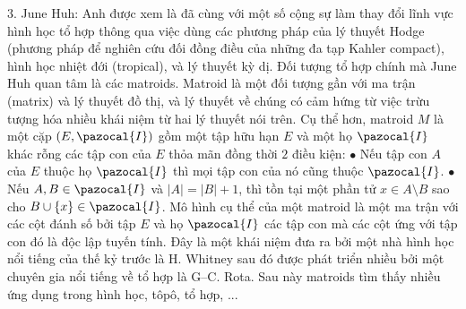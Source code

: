\begin{multicols}{2}
	$3.$ June Huh: Anh được xem là đã cùng với một số cộng sự làm thay đổi lĩnh vực hình học tổ hợp thông qua việc dùng các phương pháp của lý thuyết Hodge (phương pháp để nghiên cứu đối đồng điều của những đa tạp Kahler compact), hình học nhiệt đới (tropical), và lý thuyết kỳ dị. Đối tượng tổ hợp chính mà June Huh quan tâm là các matroids. Matroid là một đối tượng gần với ma trận (matrix) và lý thuyết đồ thị, và lý thuyết về chúng có cảm hứng từ việc trừu tượng hóa nhiều khái niệm từ hai lý thuyết nói trên. Cụ thể hơn, matroid $M$ là một cặp $(E,\pazocal{I})$ gồm một tập hữu hạn $E$ và một họ $\pazocal{I}$ khác rỗng các tập con của $E$ thỏa mãn đồng thời $2$ điều kiện:
	\vskip 0.1cm
	$\bullet$ Nếu tập con $A$ của $E$ thuộc họ $\pazocal{I}$ thì mọi tập con của nó cũng thuộc $\pazocal{I}$.
	\vskip 0.1cm
	$\bullet$ Nếu $A, B \in \pazocal{I}$ và $|A| = |B| +1$, thì tồn tại một phần tử $x \in A \setminus B$ sao cho $B \cup \{x\} \in \pazocal{I}$.
	\vskip 0.1cm
	Mô hình cụ thể của một matroid là một ma trận với các cột đánh số bởi tập $E$ và họ $\pazocal{I}$ các tập con mà các cột ứng với tập con đó là độc lập tuyến tính.
	\vskip 0.1cm
	Đây là một khái niệm đưa ra bởi một nhà hình học nổi tiếng của thế kỷ trước là H. Whitney sau đó được phát triển nhiều bởi một chuyên gia nổi tiếng về tổ hợp là G--C. Rota. Sau này matroids tìm thấy nhiều ứng dụng trong hình học, tôpô, tổ hợp, ...

\end{multicols}
